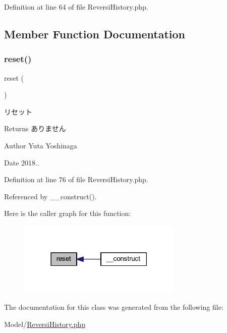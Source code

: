 Definition at line 64 of file Reversi\+History.\+php.



\subsection{Member Function Documentation}
\mbox{\label{class_reversi_history_a4a20559544fdf4dcb457e258dc976cf8}} 
\subsubsection{\texorpdfstring{reset()}{reset()}}
{\footnotesize\ttfamily reset (\begin{DoxyParamCaption}{ }\end{DoxyParamCaption})}



リセット 

\begin{DoxyReturn}{Returns}
ありません 
\end{DoxyReturn}
\begin{DoxyAuthor}{Author}
Yuta Yoshinaga 
\end{DoxyAuthor}
\begin{DoxyDate}{Date}
2018.. 
\end{DoxyDate}


Definition at line 76 of file Reversi\+History.\+php.



Referenced by \+\_\+\+\_\+construct().

Here is the caller graph for this function\+:
\nopagebreak
\begin{figure}[H]
\begin{center}
\leavevmode
\includegraphics[width=222pt]{class_reversi_history_a4a20559544fdf4dcb457e258dc976cf8_icgraph}
\end{center}
\end{figure}


The documentation for this class was generated from the following file\+:\begin{DoxyCompactItemize}
\item 
Model/\hyperlink{_reversi_history_8php}{Reversi\+History.\+php}\end{DoxyCompactItemize}
